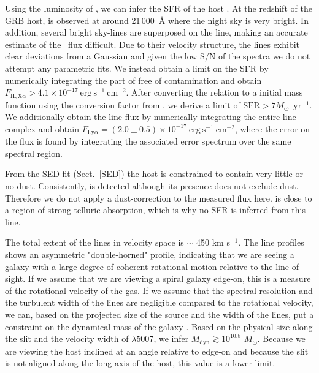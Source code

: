 \documentclass[referee]{aa}
\begin{document}
Using the luminosity of \ha, we can infer the SFR of the host
\citep{Kennicutt1998}. At the redshift of the GRB host, \ha{} is observed at
around 21\,000~\AA{} where the night sky is very bright. In addition, several
bright sky-lines are superposed on the line, making an accurate estimate of the
\ha~flux difficult. Due to their velocity structure, the lines exhibit clear
deviations from a Gaussian and given the low S/N of the spectra we do not
attempt any parametric fits. We instead obtain a limit on the SFR by numerically
integrating the part of \ha{} free of contamination and obtain $F_{\mathrm{H,X} \alpha} >
4.1 \times 10^{-17}~\mathrm{erg}~\mathrm{s}^{-1}~\mathrm{cm}^{-2}$. After
converting the \citet{Kennicutt1998} relation to a \citet{Chabrier2003} initial
mass function using the conversion factor from \citet{Madau2014}, we derive a
limit of $\mathrm{SFR} > 7 M_\odot$~yr$^{-1}$. We additionally obtain the \lya{} line
flux by numerically integrating the entire \lya{} line complex and obtain
$F_{\mathrm{Ly}\alpha} = (2.0 \pm 0.5) \times 10^{-17}~\mathrm{erg}~
\mathrm{s}^{-1}~\mathrm{cm}^{-2}$, where the error on the flux is found by
integrating the associated error spectrum over the same spectral region.


From the SED-fit (Sect.~\ref{SED}) the host is constrained to contain very
little or no dust. Consistently, \lya{} is detected although its presence does
not exclude dust. Therefore we do not apply a dust-correction to the measured
\ha{} flux here. \oii{} is close to a region of strong telluric absorption,
which is why no SFR is inferred from this line.

The total extent of the lines in velocity space is $\sim$ 450 km s$^{-1}$. The line
profiles shows an asymmetric "double-horned" profile, indicating that we are
seeing a galaxy with a large degree of coherent rotational motion relative to
the line-of-sight. If we assume that we are viewing a spiral galaxy edge-on,
this is a measure of the rotational velocity of the gas. If we assume that the
spectral resolution and the turbulent width of the lines are negligible compared
to the rotational velocity, we can, based on the projected size of the source
and the width of the lines, put a constraint on the dynamical mass of the galaxy
\citep{DeBlok2014}. Based on the physical size along the slit and the velocity
width of \oiii$\lambda5007$, we infer $M_\text{dyn} \gtrsim 10^{10.8}$
$M_\odot$. Because we are viewing the host inclined at an angle relative to
edge-on and because the slit is not aligned along the long axis of the host,
this value is a lower limit. 
\end{document}

